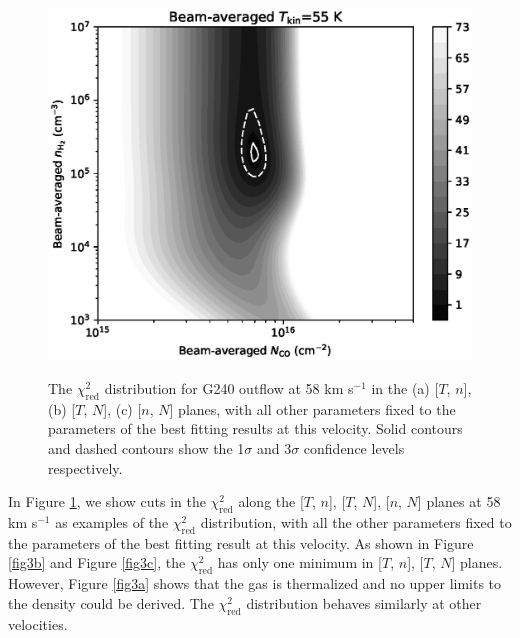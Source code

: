 \begin{figure}[tbp]
{\begin{minipage}[b]{0.5\textwidth}
\includegraphics[width=1\textwidth]{./fig/chiimage_tkin_paper.eps}
\label{fig3c}
\end{minipage}
}
\caption{The $\chi_{\mathrm{red}}^2$ distribution for G240 outflow at 58 km s$^{-1}$ in the (a) [$T$, $n$], (b) [$T$, $N$], (c) [$n$, $N$] planes, with all other parameters fixed to the parameters of the best fitting results at this velocity. Solid contours and dashed contours show the 1$\sigma$ and 3$\sigma$ confidence levels respectively. \label{fig3}}
\end{figure}

In Figure \ref{fig3}, we show cuts in the $\chi_{\mathrm{red}}^2$ along the [$T$, $n$], [$T$, $N$], [$n$, $N$] planes at 58 km s$^{-1}$ as examples of the $\chi_{\mathrm{red}}^2$ distribution, with all the other parameters fixed to the parameters of the best fitting result at this velocity. As shown in Figure \ref{fig3b} and Figure \ref{fig3c}, the $\chi_{\mathrm{red}}^2$ has only one minimum in [$T$, $n$], [$T$, $N$] planes. However, Figure \ref{fig3a} shows that the gas is thermalized and no upper limits to the density could be derived. The $\chi_{\mathrm{red}}^2$ distribution behaves similarly at other velocities. 

